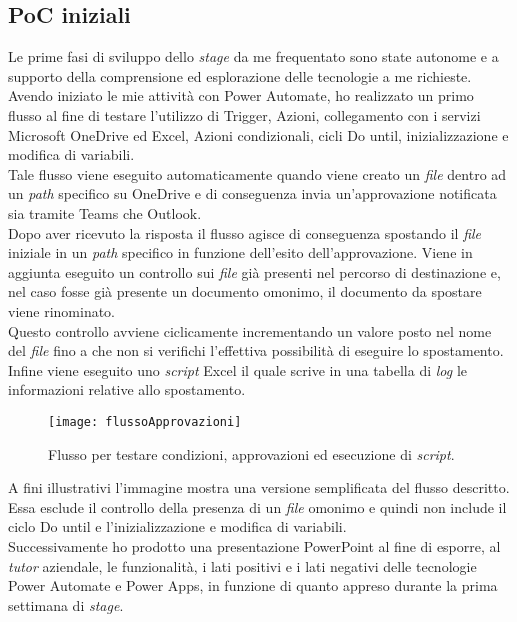 \subsection{PoC iniziali}
Le prime fasi di sviluppo dello \emph{stage} da me frequentato sono state autonome e a supporto della comprensione ed esplorazione delle tecnologie a me richieste. 
Avendo iniziato le mie attività con Power Automate, ho realizzato un primo flusso al fine di testare l'utilizzo di Trigger, Azioni, collegamento con i servizi Microsoft OneDrive ed Excel, Azioni condizionali, cicli Do until, inizializzazione e modifica di variabili.\\
Tale flusso viene eseguito automaticamente quando viene creato un \emph{file} dentro ad un \emph{path} specifico su OneDrive e di conseguenza invia un'approvazione notificata sia tramite Teams che Outlook.\\
Dopo aver ricevuto la risposta il flusso agisce di conseguenza spostando il \emph{file} iniziale in un \emph{path} specifico in funzione dell'esito dell'approvazione. Viene in aggiunta eseguito un controllo sui \emph{file} già presenti nel percorso di destinazione e, nel caso fosse già presente un documento omonimo, il documento da spostare viene rinominato.\\
Questo controllo avviene ciclicamente incrementando un valore posto nel nome del \emph{file} fino a che non si verifichi l'effettiva possibilità di eseguire lo spostamento.\\
Infine viene eseguito uno \emph{script} Excel il quale scrive in una tabella di \emph{log} le informazioni relative allo spostamento.
\begin{figure}[htbp] 
    \centering 
    \texttt{[image: flussoApprovazioni]} 
    \caption{Flusso per testare condizioni, approvazioni ed esecuzione di \emph{script}.}
    \label{fig:flussoApprovazioni}
\end{figure}

\noindent A fini illustrativi l'immagine mostra una versione semplificata del flusso descritto. Essa esclude il controllo della presenza di un \emph{file} omonimo e quindi non include il ciclo Do until e l'inizializzazione e modifica di variabili.\\
Successivamente ho prodotto una presentazione PowerPoint al fine di esporre, al \emph{tutor} aziendale, le funzionalità, i lati positivi e i lati negativi delle tecnologie Power Automate e Power Apps, in funzione di quanto appreso durante la prima settimana di \emph{stage}.

